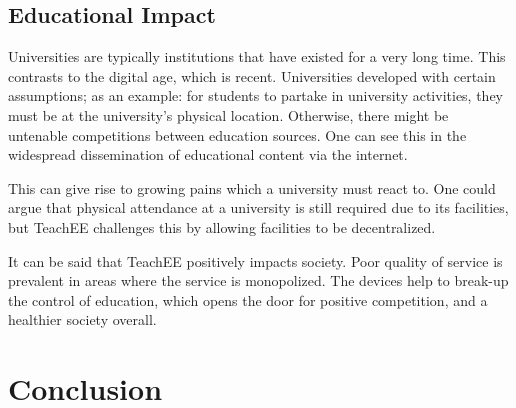 \documentclass[letterpaper,12pt]{article}
\begin{document}
\subsection{Educational Impact}

Universities are typically institutions that have existed for a very long time.
This contrasts to the digital age, which is recent. Universities developed with
certain assumptions; as an example: for students to partake in university
activities, they must be at the university's physical location. Otherwise, there
might be untenable competitions between education sources. One
can see this in the widespread dissemination of educational content via the
internet.

This can give rise to growing pains which a university must react to. One could
argue that physical attendance at a university is still required due to its
facilities, but TeachEE challenges this by allowing facilities to be
decentralized.

It can be said that TeachEE positively impacts society. Poor quality of
service is prevalent in areas where the service is monopolized. The devices help
to break-up the control of education, which opens the door for positive
competition, and a healthier society overall.


\section{Conclusion}
\newpage


\newpage
\pagestyle{empty}
\end{document}

